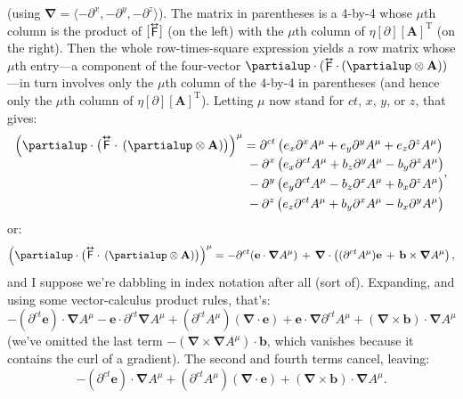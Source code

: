 \documentclass[12pt]{article}
\renewcommand{\vv}[1]{\mathbf{#1}}
\newcommand{\del}{\boldsymbol{\nabla}}
\newcommand{\tightoverset}[2]{%
  \mathop{#2}\limits^{\vbox to -.5ex{\kern-0.75ex\hbox{$#1$}\vss}}}
\newcommand{\inlinedy}[1]{\tightoverset{\text{\tiny$\bm\leftrightarrow$}}{#1}}
\newcommand{\capdy}[1]{ \overset{ \text{\tiny$\bm\leftrightarrow$} }{\vphantom{\text{\small{A}}}\smash{#1}} }
\begin{document}
(using $\del = \langle - \partial^x , - \partial^y , - \partial^z \rangle$). The matrix in parentheses is a 4-by-4 whose $\mu$th column is the product of $[\inlinedy{\mathsf{F}}]$ (on the left) with the $\mu$th column of $\eta [\partialup] [\vv A]^{\mathrm{T}}$ (on the right). Then the whole row-times-square expression yields a row matrix whose $\mu$th entry---a component of the four-vector ${\partialup \cdot (\inlinedy{\mathsf{F}} \cdot \, ( \partialup \otimes \vv A ))}$---in turn involves only the $\mu$th column of the 4-by-4 in parentheses (and hence only the $\mu$th column of $\eta [\partialup] [\vv A]^{\mathrm{T}}$). Letting $\mu$ now stand for $ct$, $x$, $y$, or $z$, that gives:
\begin{equation*}
\begin{split}
\Big( \partialup \cdot \big( \capdy{\mathsf{F}} \cdot \, ( \partialup \otimes \vv A ) \big) \Big)^{\mu} &= \partial^{ct} \, \bigl( e_x \partial^x A^{\mu} + e_y \partial^y A^{\mu} + e_z \partial^z A^{\mu} \bigr) \\[-.9ex]
& \; - \partial^x \left( e_x \partial^{ct} A^{\mu} + b_z \partial^y A^{\mu} - b_y \partial^z A^{\mu} \right) \\
& \; - \partial^y \left( e_y \partial^{ct} A^{\mu} - b_z \partial^x A^{\mu} + b_x \partial^z A^{\mu} \right) \\
& \; - \partial^z \left( e_z \partial^{ct} A^{\mu} + b_y \partial^x A^{\mu} - b_x \partial^y A^{\mu} \right)
\end{split},
\end{equation*}
or:
\begin{equation*}
\Big( \partialup \cdot \big( \capdy{\mathsf{F}} \cdot \, ( \partialup \otimes \vv A ) \big) \Big)^{\mu} = - \partial^{ct} ( \vv e \cdot \del A^{\mu} ) \, + \, \del \cdot \left( (\partial^{ct} A^{\mu}) \vv e \, + \, \vv b \times \del A^{\mu} \right) ,
\end{equation*}
and I suppose we're dabbling in index notation after all (sort of). Expanding, and using some vector-calculus product rules, that's:
\begin{equation*}
-(\partial^{ct} \vv e) \cdot \del A^{\mu} - \vv e \cdot \partial^{ct} \del A^{\mu} + (\partial^{ct} A^{\mu})(\del \cdot \vv e) + \vv e \cdot \del \partial^{ct} A^{\mu} + (\del \times \vv b) \cdot \del A^{\mu}
\end{equation*}
(we've omitted the last term $ - (\del \times \del A^{\mu}) \cdot \vv b
$, which vanishes because it contains the curl of a gradient). The second and fourth terms cancel, leaving:
\begin{equation*}
-(\partial^{ct} \vv e) \cdot \del A^{\mu} + (\partial^{ct} A^{\mu})(\del \cdot \vv e) + (\del \times \vv b) \cdot \del A^{\mu}.
\end{equation*}
\end{document}
